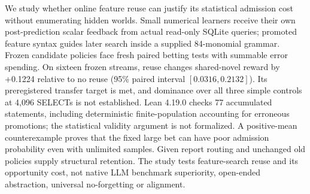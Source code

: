 We study whether online feature reuse can justify its statistical admission cost without enumerating hidden worlds. Small numerical learners receive their own post-prediction scalar feedback from actual read-only SQLite queries; promoted feature syntax guides later search inside a supplied 84-monomial grammar. Frozen candidate policies face fresh paired betting tests with summable error spending. On sixteen frozen streams, reuse changes shared-novel reward by +0.1224 relative to no reuse (95\% paired interval $[0.0316,0.2132]$). Its preregistered transfer target is met, and dominance over all three simple controls at 4,096 SELECTs is not established. Lean 4.19.0 checks 77 accumulated statements, including deterministic finite-population accounting for erroneous promotions; the statistical validity argument is not formalized. A positive-mean counterexample proves that the fixed large bet can have poor admission probability even with unlimited samples. Given report routing and unchanged old policies supply structural retention. The study tests feature-search reuse and its opportunity cost, not native LLM benchmark superiority, open-ended abstraction, universal no-forgetting or alignment.
